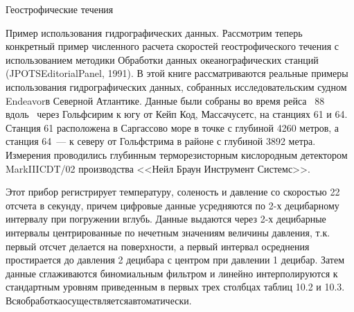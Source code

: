 \begin{chapter}{Геострофические течения}
\begin{section}{Пример использования гидрографических данных.}
Рассмотрим теперь конкретный пример численного расчета скоростей
геострофического течения с использованием методики Обработки данных
океанографических станций (JPOTSEditorialPanel, 1991). В этой книге
рассматриваются реальные примеры использования гидрографических
данных, собранных исследовательским судном Endeavorв Северной
Атлантике. Данные были собраны во время рейса \No~88 вдоль~
через Гольфсирим к югу от Кейп Код, Массачусетс, на станциях 61 и
64. Станция 61 расположена в Саргассово море в точке с глубиной 4260
метров, а станция 64~--- к северу от Гольфстрима в районе с глубиной
3892 метра. Измерения проводились глубинным терморезисторным
кислородным детектором MarkIIICDT/02 производства <<Нейл Браун
Инструмент Системс>>.
%

Этот прибор регистрирует температуру, соленость и давление со
скоростью 22 отсчета в секунду, причем цифровые данные усредняются по
2-х децибарному интервалу при погружении вглубь. Данные выдаются через
2-х децибарные интервалы центрированные по нечетным значениям величины
давления, т.к. первый отсчет делается на поверхности, а первый
интервал осреднения простирается до давления 2 децибара с центром при
давлении 1 децибар. Затем данные сглаживаются биномиальным фильтром и
линейно интерполируются к стандартным уровням приведенным в первых
трех столбцах таблиц 10.2 и 10.3. Всяобработкаосуществляетсяавтоматически.
%


\end{section}
\end{chapter}
